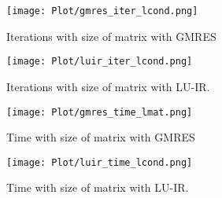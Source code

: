 \begin{figure}[ht]
     \begin{minipage}[b]{0.5\linewidth}
        \centering
   \texttt{[image: Plot/gmres\_iter\_lcond.png]}
        \caption{Iterations with size of matrix with GMRES}
        \label{fig:image21}
    \end{minipage}
    \hspace{0.5cm} 
    \begin{minipage}[b]{0.5\linewidth}
        \centering
        \texttt{[image: Plot/luir\_iter\_lcond.png]}
        \caption{Iterations with size of matrix with LU-IR.}
        \label{fig:image22}
    \end{minipage}
\end{figure}
\newpage
\begin{figure}[ht]
     \begin{minipage}[b]{0.5\linewidth}
        \centering
   \texttt{[image: Plot/gmres\_time\_lmat.png]}
        \caption{Time with size of matrix with GMRES}
        \label{fig:image23}
    \end{minipage}
    \hspace{0.5cm} 
    \begin{minipage}[b]{0.5\linewidth}
        \centering
        \texttt{[image: Plot/luir\_time\_lcond.png]}
        \caption{Time with size of matrix with LU-IR.}
        \label{fig:image24}
    \end{minipage}
\end{figure}
\clearpage
